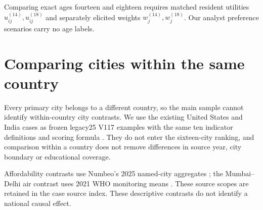 \AgeCase



Comparing exact ages fourteen and eighteen requires matched resident utilities
$u_{ij}^{(14)},u_{ij}^{(18)}$ and separately elicited weights
$w_j^{(14)},w_j^{(18)}$. Our analyst preference scenarios carry no age labels.

\section{Comparing cities within the same country}
Every primary city belongs to a different country, so the main sample cannot
identify within-country city contrasts. We use the existing United States and
India cases as frozen legacy25 V117 examples with the same ten indicator
definitions and scoring formula \cite{legacycase}. They do not enter the sixteen-city ranking,
and comparison within a country does not remove differences in source year,
city boundary or educational coverage.



\CountryInterpretation
Affordability contrasts use Numbeo's 2025 named-city aggregates
\cite{numbeocase}; the Mumbai--Delhi air contrast uses 2021 WHO monitoring
means \cite{whocase}. These source scopes are retained in the case source index.
These descriptive contrasts do not identify a national causal effect.
